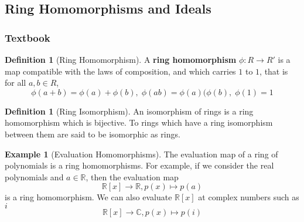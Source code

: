 \documentclass[12pt]{article}
\theoremstyle{definition}
\newtheorem{defn}[thm]{Definition}
\newtheorem{eg}[thm]{Example}
\theoremstyle{remark}
\numberwithin{equation}{section}
\newcommand\C{\mathbb C}    %
\newcommand\R{\mathbb R}    %
\newcommand\B[1]{\textbf{ #1}}
\begin{document}
\vspace{15pt}

\subsection{Ring Homomorphisms and Ideals}

\subsubsection{Textbook}

\begin{defn}[Ring Homomorphism]
        A \B{ring homomorphism} $\phi: R \rightarrow R'$ is a map compatible with the laws of composition, and which carries $1$ to $1$, that is for all $a,b \in R$, \begin{equation}
                \phi(a+b) = \phi(a) + \phi(b),\;\phi(ab) = \phi(a)(\phi(b),\;\phi(1) = 1
        \end{equation}
\end{defn}


\vspace{15pt}

\begin{defn}[Ring Isomorphism]
        An isomorphism of rings is a ring homomorphism which is bijective. To rings which have a ring isomorphism between them are said to be isomorphic as rings.
\end{defn}


\vspace{15pt}

\begin{eg}[Evaluation Homomorphisms]
        The evaluation map of a ring of polynomials is a ring homomorphisms. For example, if we consider the real polynomials and $a\in\R$, then the evaluation map \begin{equation}
                \R[x]\rightarrow \R, p(x) \mapsto p(a)
        \end{equation}
        is a ring homomorphism. We can also evaluate $\R[x]$ at complex numbers such as $i$ \begin{equation}
                \R[x] \rightarrow \C, p(x)\mapsto p(i)
        \end{equation}
\end{eg}


\vspace{15pt}
\end{document}
